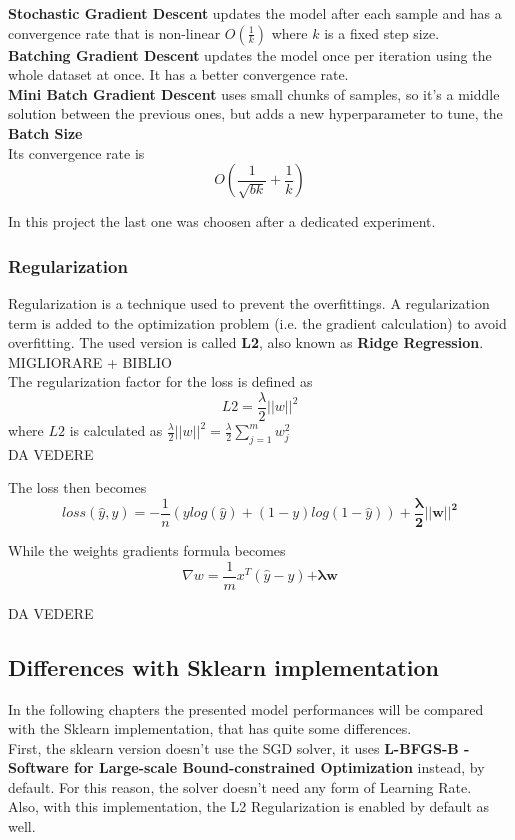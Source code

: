 \documentclass[
	letterpaper, %
	10pt, %
]{class}
\begin{document}
\textbf{Stochastic Gradient Descent} updates the model after each sample and has a convergence rate that is non-linear $O(\frac{1}{k})$ where $k$ is a fixed step size.\\

\textbf{Batching Gradient Descent} updates the model once per iteration using the whole dataset at once. It has a better convergence rate.\\

\textbf{Mini Batch Gradient Descent} uses small chunks of samples, so it's a middle solution between the previous ones, but adds a new hyperparameter to tune, the \textbf{Batch Size}\\
Its convergence rate is
$$O(\frac{1}{\sqrt{bk}} + \frac{1}{k})$$

In this project the last one was choosen after a dedicated experiment.

\subsubsection{Regularization}
Regularization is a technique used to prevent the overfittings. A regularization term is added to the optimization problem (i.e. the gradient calculation) to avoid overfitting.
The used version is called \textbf{L2}, also known as \textbf{Ridge Regression}. MIGLIORARE + BIBLIO\\

The regularization factor for the loss is defined as
$$ L2 = \frac{\lambda}{2}||w||^2 $$
where $L2$ is calculated as $ \frac{\lambda}{2}||w||^2 = \frac{\lambda}2{\displaystyle\sum_{j=1}^m w_j^2} $ \\
DA VEDERE

The loss then becomes
$$ loss(\hat{y}, y) = -\frac{1}{n}(y log(\hat{y}) + (1-y)log(1-\hat{y})) + \boldsymbol{\frac{\lambda}{2}||w||^2} $$

While the weights gradients formula becomes
$$ \nabla w = \frac{1}{m}x^T(\hat{y} - y) \boldsymbol{+ \lambda w} $$

DA VEDERE

\subsection{Differences with Sklearn implementation}

In the following chapters the presented model performances will be compared with the Sklearn implementation, that has quite some differences.\\
First, the sklearn version doesn't use the SGD solver, it uses \textbf{L-BFGS-B - Software for Large-scale Bound-constrained Optimization} instead, by default.
For this reason, the solver doesn't need any form of Learning Rate.\\
Also, with this implementation, the L2 Regularization is enabled by default as well.
\end{document}
